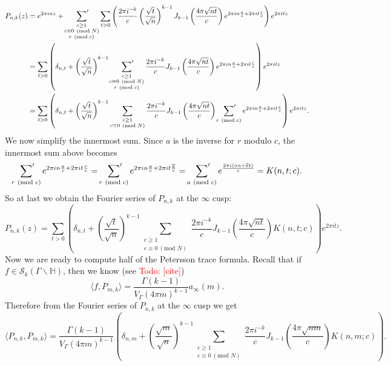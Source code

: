 \documentclass[12pt]{book}
\theoremstyle{definition}\newframedtheorem{method}{Method}
\newcommand{\psum}{\sideset{}{'}\sum}
\newcommand{\tmod}[1]{\ \left(\text{mod }#1\right)}
\newcommand{\mc}{\mathcal}
\renewcommand{\H}{\mathbb{H}}
\renewcommand{\d}{\delta}
\newcommand{\G}{\Gamma}
\newcommand{\<}{\langle}
\renewcommand{\>}{\rangle}
\newcommand{\conj}{\overline}
\newcommand{\GH}{\G\backslash\H}
\newcommand{\todo}[1]{\textcolor{red}{\sf Todo: [#1]}}
\begin{document}
      \begin{align*}
        P_{n,k}(z) &= e^{2\pi inz}+\psum_{\substack{c \ge 1 \\ c \equiv 0 \tmod{N} \\ r \tmod{c}}}\sum_{t > 0}\left(\frac{2\pi i^{-k}}{c}\left(\frac{\sqrt{t}}{\sqrt{n}}\right)^{k-1}J_{k-1}\left(\frac{4\pi\sqrt{nt}}{c}\right)e^{2\pi in\frac{a}{c}+2\pi it\frac{r}{c}}\right)e^{2\pi itz} \\
        &= \sum_{t > 0}\left(\d_{n,t}+\left(\frac{\sqrt{t}}{\sqrt{n}}\right)^{k-1}\psum_{\substack{c \ge 1 \\ c \equiv 0 \tmod{N} \\ r \tmod{c}}}\frac{2\pi i^{-k}}{c}J_{k-1}\left(\frac{4\pi\sqrt{nt}}{c}\right)e^{2\pi in\frac{a}{c}+2\pi it\frac{r}{c}}\right)e^{2\pi itz} \\
        &= \sum_{t > 0}\left(\d_{n,t}+\left(\frac{\sqrt{t}}{\sqrt{n}}\right)^{k-1}\sum_{\substack{c \ge 1 \\ c \equiv 0 \tmod{N}}}\frac{2\pi i^{-k}}{c}J_{k-1}\left(\frac{4\pi\sqrt{nt}}{c}\right)\psum_{r \tmod{c}}e^{2\pi in\frac{a}{c}+2\pi it\frac{r}{c}}\right)e^{2\pi itz}. \\
      \end{align*}
      We now simplify the innermost sum. Since $a$ is the inverse for $r$ modulo $c$, the innermost sum above becomes
      \[
        \psum_{r \tmod{c}}e^{2\pi in\frac{a}{c}+2\pi it\frac{r}{c}} = \psum_{r \tmod{c}}e^{2\pi in\frac{a}{c}+2\pi it\frac{\conj{a}}{c}} = \psum_{a \tmod{c}}e^{\frac{2\pi i(an+\conj{a}t)}{c}} = K(n,t;c).
      \]
      So at last we obtain the Fourier series of $P_{n,k}$ at the $\infty$ cusp:
      \[
        P_{n,k}(z) = \sum_{t > 0}\left(\d_{n,t}+\left(\frac{\sqrt{t}}{\sqrt{n}}\right)^{k-1}\sum_{\substack{c \ge 1 \\ c \equiv 0 \tmod{N}}}\frac{2\pi i^{-k}}{c}J_{k-1}\left(\frac{4\pi\sqrt{nt}}{c}\right)K(n,t;c)\right)e^{2\pi itz}.
      \]
      Now we are ready to compute half of the Petersson trace formula. Recall that if $f \in \mc{S}_{k}(\GH)$, then we know (see \todo{cite})
      \[
        \<f,P_{m,k}\> = \frac{\G(k-1)}{V_{\G}(4\pi m)^{k-1}}a_{\infty}(m).
      \]
      Therefore from the Fourier series of $P_{n,k}$ at the $\infty$ cusp we get
      \[
        \<P_{n,k},P_{m,k}\> = \frac{\G(k-1)}{V_{\G}(4\pi m)^{k-1}}\left(\d_{n,m}+\left(\frac{\sqrt{m}}{\sqrt{n}}\right)^{k-1}\sum_{\substack{c \ge 1 \\ c \equiv 0 \tmod{N}}}\frac{2\pi i^{-k}}{c}J_{k-1}\left(\frac{4\pi\sqrt{nm}}{c}\right)K(n,m;c)\right).
      \]
\end{document}
